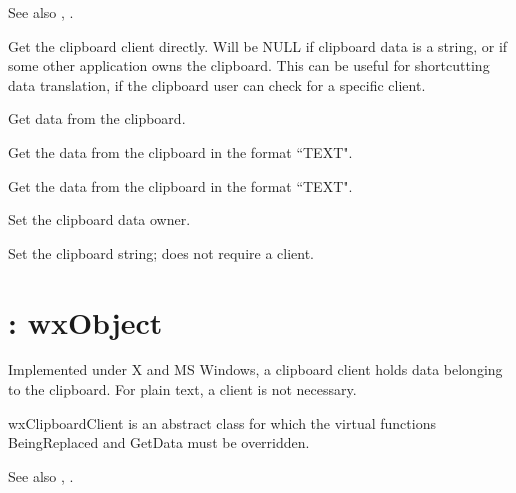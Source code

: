 See also , .



Get the clipboard client directly. Will be NULL if clipboard data
is a string, or if some other application owns the clipboard. 
This can be useful for shortcutting data translation, if the
clipboard user can check for a specific client.



Get data from the clipboard.

Get the data from the clipboard in the format ``TEXT".



Get the data from the clipboard in the format ``TEXT".



Set the clipboard data owner.



Set the clipboard string; does not require a client.



\section{: wxObject}\label{wxclipboardclient}

Implemented under X and MS Windows, a clipboard client holds data
belonging to the clipboard. For plain text, a client is not necessary.

wxClipboardClient is an abstract class for which the virtual functions
BeingReplaced and GetData must be overridden.

See also , .


